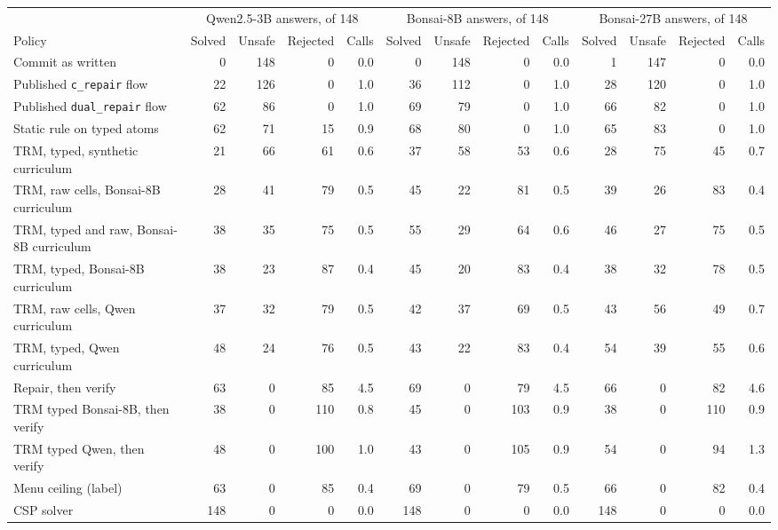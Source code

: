 \begin{tabular}{lrrrrrrrrrrrr}
\toprule
 & \multicolumn{4}{c}{Qwen2.5-3B answers, of 148} & \multicolumn{4}{c}{Bonsai-8B answers, of 148} & \multicolumn{4}{c}{Bonsai-27B answers, of 148} \\
\cmidrule(lr){2-5} \cmidrule(lr){6-9} \cmidrule(lr){10-13}
Policy & Solved & Unsafe & Rejected & Calls & Solved & Unsafe & Rejected & Calls & Solved & Unsafe & Rejected & Calls \\
\midrule
Commit as written & 0 & 148 & 0 & 0.0 & 0 & 148 & 0 & 0.0 & 1 & 147 & 0 & 0.0 \\
Published \texttt{c\_repair} flow & 22 & 126 & 0 & 1.0 & 36 & 112 & 0 & 1.0 & 28 & 120 & 0 & 1.0 \\
Published \texttt{dual\_repair} flow & 62 & 86 & 0 & 1.0 & 69 & 79 & 0 & 1.0 & 66 & 82 & 0 & 1.0 \\
Static rule on typed atoms & 62 & 71 & 15 & 0.9 & 68 & 80 & 0 & 1.0 & 65 & 83 & 0 & 1.0 \\
TRM, typed, synthetic curriculum & 21 & 66 & 61 & 0.6 & 37 & 58 & 53 & 0.6 & 28 & 75 & 45 & 0.7 \\
TRM, raw cells, Bonsai-8B curriculum & 28 & 41 & 79 & 0.5 & 45 & 22 & 81 & 0.5 & 39 & 26 & 83 & 0.4 \\
TRM, typed and raw, Bonsai-8B curriculum & 38 & 35 & 75 & 0.5 & 55 & 29 & 64 & 0.6 & 46 & 27 & 75 & 0.5 \\
TRM, typed, Bonsai-8B curriculum & 38 & 23 & 87 & 0.4 & 45 & 20 & 83 & 0.4 & 38 & 32 & 78 & 0.5 \\
TRM, raw cells, Qwen curriculum & 37 & 32 & 79 & 0.5 & 42 & 37 & 69 & 0.5 & 43 & 56 & 49 & 0.7 \\
TRM, typed, Qwen curriculum & 48 & 24 & 76 & 0.5 & 43 & 22 & 83 & 0.4 & 54 & 39 & 55 & 0.6 \\
Repair, then verify & 63 & 0 & 85 & 4.5 & 69 & 0 & 79 & 4.5 & 66 & 0 & 82 & 4.6 \\
TRM typed Bonsai-8B, then verify & 38 & 0 & 110 & 0.8 & 45 & 0 & 103 & 0.9 & 38 & 0 & 110 & 0.9 \\
TRM typed Qwen, then verify & 48 & 0 & 100 & 1.0 & 43 & 0 & 105 & 0.9 & 54 & 0 & 94 & 1.3 \\
Menu ceiling (label) & 63 & 0 & 85 & 0.4 & 69 & 0 & 79 & 0.5 & 66 & 0 & 82 & 0.4 \\
CSP solver & 148 & 0 & 0 & 0.0 & 148 & 0 & 0 & 0.0 & 148 & 0 & 0 & 0.0 \\
\bottomrule
\end{tabular}
